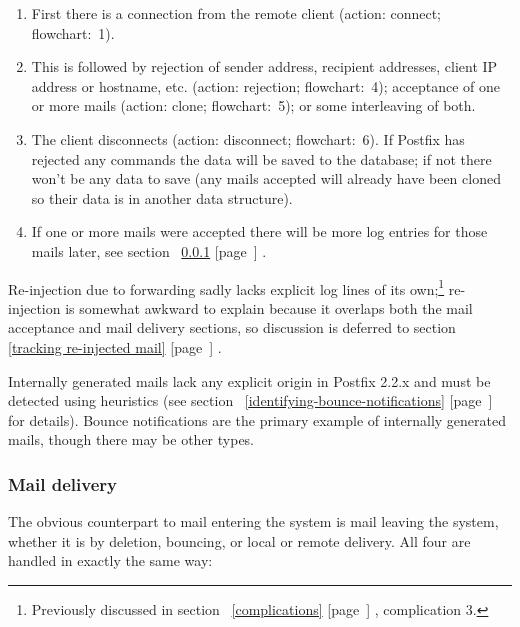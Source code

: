\documentclass[a4paper,12pt,draft]{article}
\newcommand{\refwithpage}[1]{%
    \empty{}\ref{#1} [page~\pageref{#1}]%
}
\begin{document}
\begin{enumerate}
        
    \item First there is a connection from the remote client
        (action: connect; flowchart:~1).

    \item This is followed by rejection of sender address, recipient
        addresses, client IP address or hostname, etc. (action: rejection;
        flowchart:~4); acceptance of one or more mails (action: clone;
        flowchart:~5); or some interleaving of both.
        
    \item The client disconnects (action: disconnect; flowchart:~6).  If
        Postfix has rejected any \SMTP{} commands the data will be saved to
        the database; if not there won't be any data to save (any mails
        accepted will already have been cloned so their data is in another
        data structure).

    \item If one or more mails were accepted there will be more log entries
        for those mails later, see section~\refwithpage{mail-delivery}.

\end{enumerate}

Re-injection due to forwarding sadly lacks explicit log lines of its
own;\footnote{Previously discussed in section~\refwithpage{complications},
complication 3.} re-injection is somewhat awkward to explain because it
overlaps both the mail acceptance and mail delivery sections, so discussion
is deferred to section~\refwithpage{tracking re-injected mail}.

Internally generated mails lack any explicit origin in Postfix 2.2.x and
must be detected using heuristics (see
section~\refwithpage{identifying-bounce-notifications} for details).
Bounce notifications are the primary example of internally generated mails,
though there may be other types.

\subsubsection{Mail delivery}

\label{mail-delivery}

The obvious counterpart to mail entering the system is mail leaving the
system, whether it is by deletion, bouncing, or local or remote delivery.
All four are handled in exactly the same way:
\end{document}
